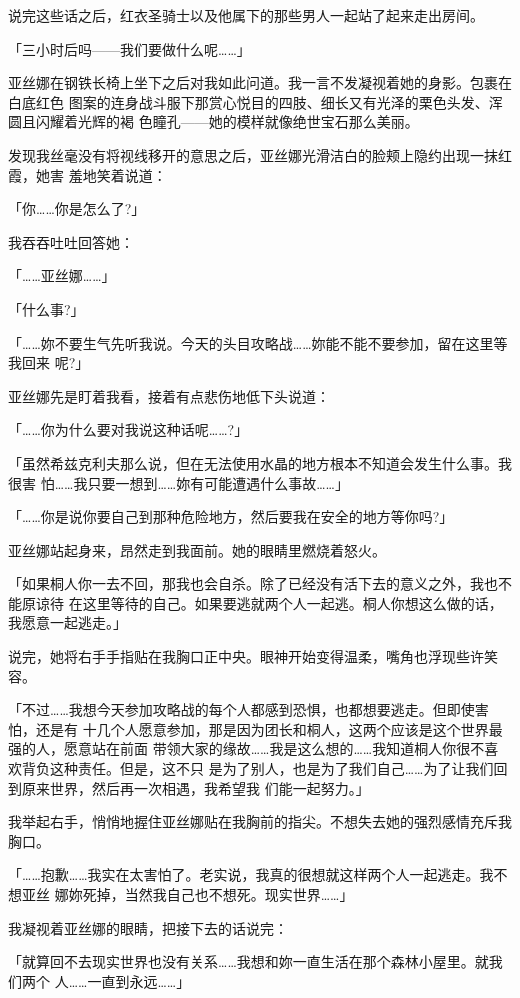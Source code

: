 \documentclass[11pt]{book}
\begin{document}
说完这些话之后，红衣圣骑士以及他属下的那些男人一起站了起来走出房间。

「三小时后吗——我们要做什么呢……」

亚丝娜在钢铁长椅上坐下之后对我如此问道。我一言不发凝视着她的身影。包裹在白底红色
图案的连身战斗服下那赏心悦目的四肢、细长又有光泽的栗色头发、浑圆且闪耀着光辉的褐
色瞳孔——她的模样就像绝世宝石那么美丽。

发现我丝毫没有将视线移开的意思之后，亚丝娜光滑洁白的脸颊上隐约出现一抹红霞，她害
羞地笑着说道：

「你……你是怎么了?」

我吞吞吐吐回答她：

「……亚丝娜……」

「什么事?」

「……妳不要生气先听我说。今天的头目攻略战……妳能不能不要参加，留在这里等我回来
呢?」

亚丝娜先是盯着我看，接着有点悲伤地低下头说道：

「……你为什么要对我说这种话呢……?」

「虽然希兹克利夫那么说，但在无法使用水晶的地方根本不知道会发生什么事。我很害
怕……我只要一想到……妳有可能遭遇什么事故……」

「……你是说你要自己到那种危险地方，然后要我在安全的地方等你吗?」

亚丝娜站起身来，昂然走到我面前。她的眼睛里燃烧着怒火。

「如果桐人你一去不回，那我也会自杀。除了已经没有活下去的意义之外，我也不能原谅待
在这里等待的自己。如果要逃就两个人一起逃。桐人你想这么做的话，我愿意一起逃走。」

说完，她将右手手指贴在我胸口正中央。眼神开始变得温柔，嘴角也浮现些许笑容。

「不过……我想今天参加攻略战的每个人都感到恐惧，也都想要逃走。但即使害怕，还是有
十几个人愿意参加，那是因为团长和桐人，这两个应该是这个世界最强的人，愿意站在前面
带领大家的缘故……我是这么想的……我知道桐人你很不喜欢背负这种责任。但是，这不只
是为了别人，也是为了我们自己……为了让我们回到原来世界，然后再一次相遇，我希望我
们能一起努力。」

我举起右手，悄悄地握住亚丝娜贴在我胸前的指尖。不想失去她的强烈感情充斥我胸口。

「……抱歉……我实在太害怕了。老实说，我真的很想就这样两个人一起逃走。我不想亚丝
娜妳死掉，当然我自己也不想死。现实世界……」

我凝视着亚丝娜的眼睛，把接下去的话说完：

「就算回不去现实世界也没有关系……我想和妳一直生活在那个森林小屋里。就我们两个
人……一直到永远……」
\end{document}

